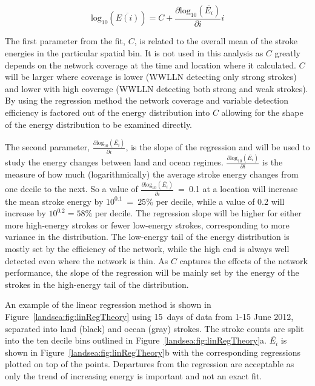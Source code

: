 
\begin{equation}
\text{log}_{10}(\overline{E(i)}) = C + \frac{\partial \text{log}_{10}(\overline{E_i})}{\partial i} i
\end{equation}

The first parameter from the fit, $C$, is related to the overall mean of the stroke energies in the particular spatial bin.
It is not used in this analysis as $C$ greatly depends on the network coverage at the time and location where it calculated.
$C$ will be larger where coverage is lower (WWLLN detecting only strong strokes) and lower with high coverage (WWLLN detecting both strong and weak strokes).
By using the regression method the network coverage and variable detection efficiency is factored out of the energy distribution into $C$ allowing for the shape of the energy distribution to be examined directly.

The second parameter, $\frac{\partial \text{log}_{10}(\overline{E_i})}{\partial i}$, is the slope of the regression and will be used to study the energy changes between land and ocean regimes.
$\frac{\partial \text{log}_{10}(\overline{E_i})}{\partial i}$ is the measure of how much (logarithmically) the average stroke energy changes from one decile to the next.
So a value of $\frac{\partial \text{log}_{10}(\overline{E_i})}{\partial i}$~=~0.1 at a location will increase the mean stroke energy by $10^{0.1}~=~25\%$ per decile, while a value of 0.2 will increase by $10^{0.2} = 58\%$ per decile.
The regression slope will be higher for either more high-energy strokes or fewer low-energy strokes, corresponding to more variance in the distribution.
The low-energy tail of the energy distribution is mostly set by the efficiency of the network, while the high end is always well detected even where the network is thin.
As $C$ captures the effects of the network performance, the slope of the regression will be mainly set by the energy of the strokes in the high-energy tail of the distribution.


An example of the linear regression method is shown in Figure~\ref{landsea:fig:linRegTheory} using 15~days of data from 1-15 June 2012, separated into land (black) and ocean (gray) strokes.
The stroke counts are split into the ten decile bins outlined in Figure~\ref{landsea:fig:linRegTheory}a.
$\overline{E_i}$ is shown in Figure~\ref{landsea:fig:linRegTheory}b with the corresponding regressions plotted on top of the points.
Departures from the regression are acceptable as only the trend of increasing energy is important and not an exact fit.

